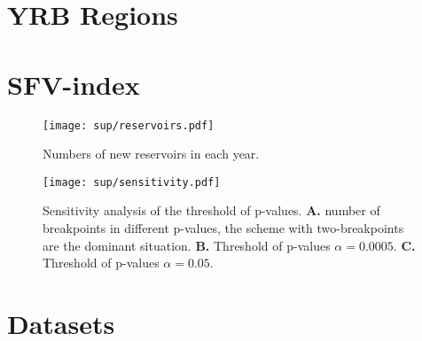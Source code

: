\documentclass[default, sn-standardnature]{sn-jnl}%
\theoremstyle{thmstyleone}%
\theoremstyle{thmstyletwo}%
\theoremstyle{thmstylethree}%
\begin{document}
\begin{appendices}

\section{YRB Regions}\label{secA1}


\section{SFV-index}\label{secA2}





\begin{figure}[tb]
    \centering
    \texttt{[image: sup/reservoirs.pdf]}
    \caption{
        Numbers of new reservoirs in each year.
    }
    \label{fig:reservoirs}
\end{figure}

\begin{figure}
    \centering
    \texttt{[image: sup/sensitivity.pdf]}
    \caption{
        Sensitivity analysis of the threshold of p-values.
        \textbf{A.} number of breakpoints in different p-values, the scheme with two-breakpoints are the dominant situation.
        \textbf{B.} Threshold of p-values $\alpha=0.0005$.
        \textbf{C.} Threshold of p-values $\alpha=0.05$.
    }
    \label{fig:sensitivity}
\end{figure}


\section{Datasets}\label{secA3}


\end{appendices}
\end{document}
